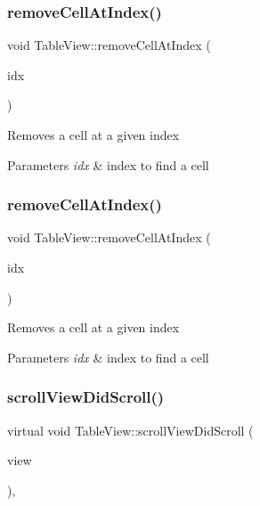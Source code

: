 \subsubsection{\texorpdfstring{remove\+Cell\+At\+Index()}{removeCellAtIndex()}\hspace{0.1cm}{\footnotesize\ttfamily [1/2]}}
{\footnotesize\ttfamily void Table\+View\+::remove\+Cell\+At\+Index (\begin{DoxyParamCaption}\item[{ssize\+\_\+t}]{idx }\end{DoxyParamCaption})}

Removes a cell at a given index


\begin{DoxyParams}{Parameters}
{\em idx} & index to find a cell \\
\hline
\end{DoxyParams}
\mbox{\label{classTableView_afaef50b9df2cc2c3d34bb157d046f73f}} 
\subsubsection{\texorpdfstring{remove\+Cell\+At\+Index()}{removeCellAtIndex()}\hspace{0.1cm}{\footnotesize\ttfamily [2/2]}}
{\footnotesize\ttfamily void Table\+View\+::remove\+Cell\+At\+Index (\begin{DoxyParamCaption}\item[{ssize\+\_\+t}]{idx }\end{DoxyParamCaption})}

Removes a cell at a given index


\begin{DoxyParams}{Parameters}
{\em idx} & index to find a cell \\
\hline
\end{DoxyParams}
\mbox{\label{classTableView_ac81b28599ca1bad73bf28b8d2e3d72bf}} 
\subsubsection{\texorpdfstring{scroll\+View\+Did\+Scroll()}{scrollViewDidScroll()}\hspace{0.1cm}{\footnotesize\ttfamily [1/2]}}
{\footnotesize\ttfamily virtual void Table\+View\+::scroll\+View\+Did\+Scroll (\begin{DoxyParamCaption}\item[{\hyperlink{classScrollView}{Scroll\+View} $\ast$}]{view }\end{DoxyParamCaption})\hspace{0.3cm}{\ttfamily [override]}, {\ttfamily [virtual]}}

